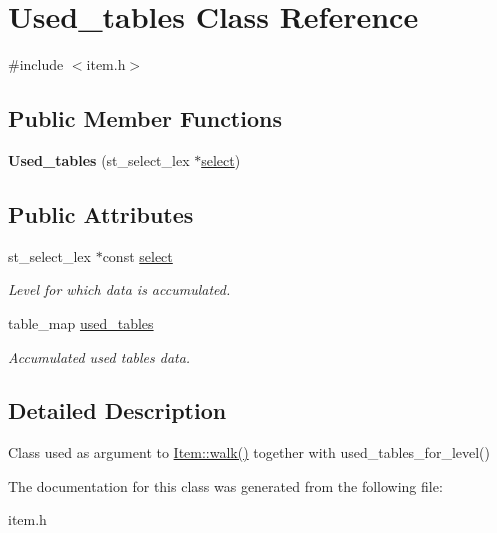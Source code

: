\hypertarget{classUsed__tables}{}\section{Used\+\_\+tables Class Reference}
\label{classUsed__tables}


{\ttfamily \#include $<$item.\+h$>$}

\subsection*{Public Member Functions}
\begin{DoxyCompactItemize}
\item 
\mbox{\label{classUsed__tables_ac35171a47ed99faecbe349b0ab6fc82f}} 
{\bfseries Used\+\_\+tables} (st\+\_\+select\+\_\+lex $\ast$\mbox{\hyperlink{classUsed__tables_a2dec2f6bc062caf37ccc9289936f71b6}{select}})
\end{DoxyCompactItemize}
\subsection*{Public Attributes}
\begin{DoxyCompactItemize}
\item 
\mbox{\label{classUsed__tables_a2dec2f6bc062caf37ccc9289936f71b6}} 
st\+\_\+select\+\_\+lex $\ast$const \mbox{\hyperlink{classUsed__tables_a2dec2f6bc062caf37ccc9289936f71b6}{select}}
\begin{DoxyCompactList}\small\item\em Level for which data is accumulated. \end{DoxyCompactList}\item 
\mbox{\label{classUsed__tables_a85bcf6d10f2ce67c6870aedf1a21640d}} 
table\+\_\+map \mbox{\hyperlink{classUsed__tables_a85bcf6d10f2ce67c6870aedf1a21640d}{used\+\_\+tables}}
\begin{DoxyCompactList}\small\item\em Accumulated used tables data. \end{DoxyCompactList}\end{DoxyCompactItemize}


\subsection{Detailed Description}
Class used as argument to \mbox{\hyperlink{classItem_ab7d2529511c14a77e59a1b1bbabc95d7}{Item\+::walk()}} together with used\+\_\+tables\+\_\+for\+\_\+level() 

The documentation for this class was generated from the following file\+:\begin{DoxyCompactItemize}
\item 
item.\+h\end{DoxyCompactItemize}
